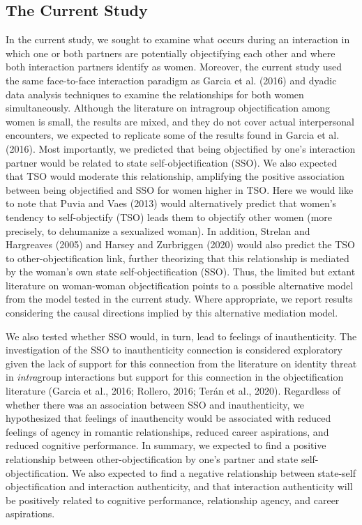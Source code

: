 \documentclass[man]{apa6}
\begin{document}
\subsection{The Current Study}\label{the-current-study}

In the current study, we sought to examine what occurs during an
interaction in which one or both partners are potentially objectifying
each other and where both interaction partners identify as women.
Moreover, the current study used the same face-to-face interaction
paradigm as Garcia et al. (2016) and dyadic data analysis techniques to
examine the relationships for both women simultaneously. Although the
literature on intragroup objectification among women is small, the
results are mixed, and they do not cover actual interpersonal
encounters, we expected to replicate some of the results found in Garcia
et al. (2016). Most importantly, we predicted that being objectified by
one's interaction partner would be related to state self-objectification
(SSO). We also expected that TSO would moderate this relationship,
amplifying the positive association between being objectified and SSO
for women higher in TSO. Here we would like to note that Puvia and Vaes
(2013) would alternatively predict that women's tendency to
self-objectify (TSO) leads them to objectify other women (more
precisely, to dehumanize a sexualized woman). In addition, Strelan and
Hargreaves (2005) and Harsey and Zurbriggen (2020) would also predict
the TSO to other-objectification link, further theorizing that this
relationship is mediated by the woman's own state self-objectification
(SSO). Thus, the limited but extant literature on woman-woman
objectification points to a possible alternative model from the model
tested in the current study. Where appropriate, we report results
considering the causal directions implied by this alternative mediation
model.

We also tested whether SSO would, in turn, lead to feelings of
inauthenticity. The investigation of the SSO to inauthenticity
connection is considered exploratory given the lack of support for this
connection from the literature on identity threat in \emph{intra}group
interactions but support for this connection in the objectification
literature (Garcia et al., 2016; Rollero, 2016; Terán et al., 2020).
Regardless of whether there was an association between SSO and
inauthenticity, we hypothesized that feelings of inauthencity would be
associated with reduced feelings of agency in romantic relationships,
reduced career aspirations, and reduced cognitive performance. In
summary, we expected to find a positive relationship between
other-objectification by one's partner and state self-objectification.
We also expected to find a negative relationship between state-self
objectification and interaction authenticity, and that interaction
authenticity will be positively related to cognitive performance,
relationship agency, and career aspirations.
\end{document}
